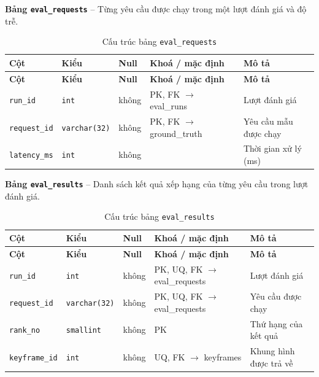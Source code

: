 \textbf{Bảng \texttt{eval\_requests}} -- Từng yêu cầu được chạy trong một lượt đánh giá và độ trễ.

\setlength{\tabcolsep}{4pt}
\begin{longtable}{>{\raggedright\arraybackslash}p{}>{\raggedright\arraybackslash}p{}>{\centering\arraybackslash}p{}>{\raggedright\arraybackslash}p{}>{\raggedright\arraybackslash}p{}}
\caption{Cấu trúc bảng \texttt{eval\_requests}}\label{tab:col_eval_requests}\\
\toprule \textbf{Cột} & \textbf{Kiểu} & \textbf{Null} & \textbf{Khoá / mặc định} & \textbf{Mô tả} \\ \midrule \endfirsthead
\toprule \textbf{Cột} & \textbf{Kiểu} & \textbf{Null} & \textbf{Khoá / mặc định} & \textbf{Mô tả} \\ \midrule \endhead
\bottomrule \endfoot
\texttt{run\_id} & {\footnotesize\texttt{int}} & không & PK, FK $\rightarrow$ eval\_runs & Lượt đánh giá \\
\texttt{request\_id} & {\footnotesize\texttt{varchar(32)}} & không & PK, FK $\rightarrow$ ground\_truth & Yêu cầu mẫu được chạy \\
\texttt{latency\_ms} & {\footnotesize\texttt{int}} & không &  & Thời gian xử lý (ms) \\
\end{longtable}

\textbf{Bảng \texttt{eval\_results}} -- Danh sách kết quả xếp hạng của từng yêu cầu trong lượt đánh giá.

\setlength{\tabcolsep}{4pt}
\begin{longtable}{>{\raggedright\arraybackslash}p{}>{\raggedright\arraybackslash}p{}>{\centering\arraybackslash}p{}>{\raggedright\arraybackslash}p{}>{\raggedright\arraybackslash}p{}}
\caption{Cấu trúc bảng \texttt{eval\_results}}\label{tab:col_eval_results}\\
\toprule \textbf{Cột} & \textbf{Kiểu} & \textbf{Null} & \textbf{Khoá / mặc định} & \textbf{Mô tả} \\ \midrule \endfirsthead
\toprule \textbf{Cột} & \textbf{Kiểu} & \textbf{Null} & \textbf{Khoá / mặc định} & \textbf{Mô tả} \\ \midrule \endhead
\bottomrule \endfoot
\texttt{run\_id} & {\footnotesize\texttt{int}} & không & PK, UQ, FK $\rightarrow$ eval\_requests & Lượt đánh giá \\
\texttt{request\_id} & {\footnotesize\texttt{varchar(32)}} & không & PK, UQ, FK $\rightarrow$ eval\_requests & Yêu cầu được chạy \\
\texttt{rank\_no} & {\footnotesize\texttt{smallint}} & không & PK & Thứ hạng của kết quả \\
\texttt{keyframe\_id} & {\footnotesize\texttt{int}} & không & UQ, FK $\rightarrow$ keyframes & Khung hình được trả về \\
\end{longtable}
